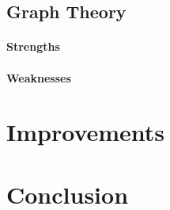 \documentclass[14]{article}
\begin{document}










\subsection{Graph Theory}

\paragraph{Strengths}

\paragraph{Weaknesses}

\section{Improvements}

\section{Conclusion}


	
\end{document}
